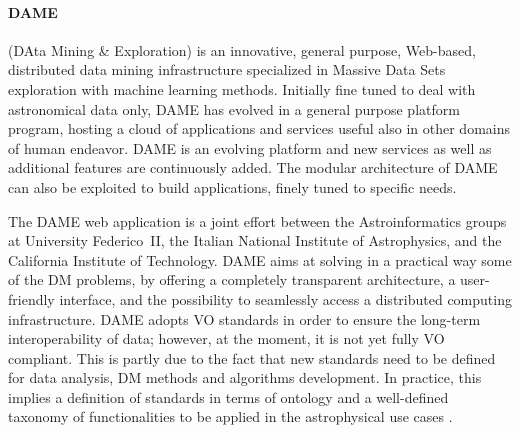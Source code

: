 
    \paragraph{DAME}


    (DAta Mining \& Exploration) is an innovative, general purpose,
    Web-based, distributed data mining infrastructure specialized in
    Massive Data Sets exploration with machine learning
    methods. Initially fine tuned to deal with astronomical data only,
    DAME has evolved in a general purpose platform program, hosting a
    cloud of applications and services useful also in other domains of
    human endeavor. DAME is an evolving platform and new services as
    well as additional features are continuously added. The modular
    architecture of DAME can also be exploited to build applications,
    finely tuned to specific needs. 

    The DAME web application is a joint effort between the
    Astroinformatics groups at University Federico~II, the Italian
    National Institute of Astrophysics, and the California Institute
    of Technology.  DAME aims at solving in a practical way some of
    the DM problems, by offering a completely transparent
    architecture, a user-friendly interface, and the possibility to
    seamlessly access a distributed computing infrastructure. DAME
    adopts VO standards in order to ensure the long-term
    interoperability of data; however, at the moment, it is not yet
    fully VO compliant. This is partly due to the fact that new
    standards need to be defined for data analysis, DM methods and
    algorithms development. In practice, this implies a definition of
    standards in terms of ontology and a well-defined taxonomy of
    functionalities to be applied in the astrophysical use
    cases \cite{brescia2011extracting}.  

\break



